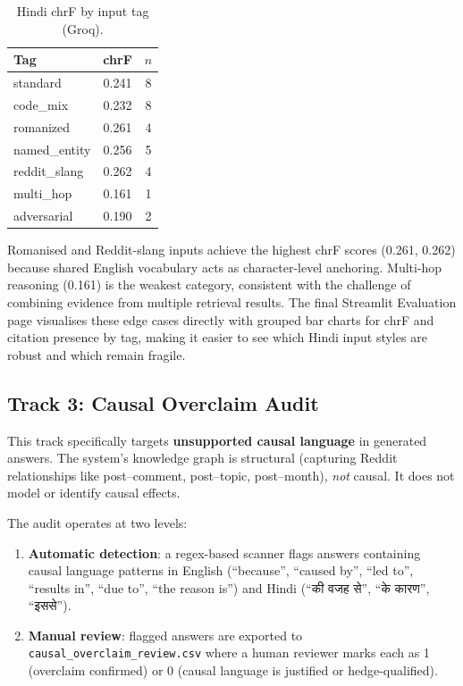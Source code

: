 \documentclass[11pt,a4paper]{article}
\begin{document}
\begin{table}[H]
\centering
\caption{Hindi chrF by input tag (Groq).}
\label{tab:hindi-tags}
\begin{tabular}{lcc}
\toprule
Tag & chrF & $n$ \\
\midrule
standard        & 0.241 & 8 \\
code\_mix       & 0.232 & 8 \\
romanized       & 0.261 & 4 \\
named\_entity   & 0.256 & 5 \\
reddit\_slang   & 0.262 & 4 \\
multi\_hop      & 0.161 & 1 \\
adversarial     & 0.190 & 2 \\
\bottomrule
\end{tabular}
\end{table}

Romanised and Reddit-slang inputs achieve the highest chrF scores (0.261, 0.262) because shared English vocabulary acts as character-level anchoring. Multi-hop reasoning (0.161) is the weakest category, consistent with the challenge of combining evidence from multiple retrieval results. The final Streamlit Evaluation page visualises these edge cases directly with grouped bar charts for chrF and citation presence by tag, making it easier to see which Hindi input styles are robust and which remain fragile.


\subsection{Track 3: Causal Overclaim Audit}
\label{sec:eval-causal}

This track specifically targets \textbf{unsupported causal language} in generated answers. The system's knowledge graph is structural (capturing Reddit relationships like post--comment, post--topic, post--month), \textit{not} causal. It does not model or identify causal effects.

The audit operates at two levels:

\begin{enumerate}[leftmargin=*]
  \item \textbf{Automatic detection}: a regex-based scanner flags answers containing causal language patterns in English (``because'', ``caused by'', ``led to'', ``results in'', ``due to'', ``the reason is'') and Hindi (``\texthindi{की वजह से}'', ``\texthindi{के कारण}'', ``\texthindi{इससे}'').
  
  \item \textbf{Manual review}: flagged answers are exported to \texttt{causal\_overclaim\_review.csv} where a human reviewer marks each as 1 (overclaim confirmed) or 0 (causal language is justified or hedge-qualified).
\end{enumerate}
\end{document}
